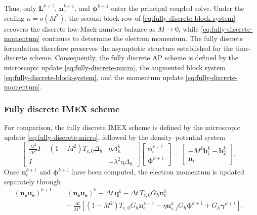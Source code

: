 \documentclass[pdflatex,final,10pt]{article}
\begin{document}
Thus, only $\boldsymbol{L}^{k+1}$, $\boldsymbol{n}_e^{k+1}$, and
$\boldsymbol{\phi}^{k+1}$ enter the principal coupled solve. Under the
scaling $\kappa=o(M^2)$, the second block row of
\eqref{eq:fully-discrete-block-system} recovers the discrete
low-Mach-number balance as $M\to0$, while
\eqref{eq:fully-discrete-momentum} continues to determine the electron
momentum. The fully discrete formulation therefore preserves the
asymptotic structure established for the time-discrete scheme.
Consequently, the fully discrete AP scheme is defined by the microscopic
update \eqref{eq:fully-discrete-micro}, the augmented block system
\eqref{eq:fully-discrete-block-system}, and the momentum update
\eqref{eq:fully-discrete-momentum}.

\subsubsection{Fully discrete IMEX scheme}

For comparison, the fully discrete IMEX scheme is defined by the
microscopic update \eqref{eq:fully-discrete-micro}, followed by the
density--potential system
\begin{equation}
    \begin{bmatrix}
        \displaystyle
        \frac{M^2}{\Delta t^2}I
        -(1-M^2)T_{e,0}\Delta_h
        &
        \eta\mathcal{A}_h^k
        \\[0.4em]
        I
        &
        -\lambda^2\eta\Delta_h
    \end{bmatrix}
    \begin{bmatrix}
        \boldsymbol{n}_e^{k+1}\\
        \boldsymbol{\phi}^{k+1}
    \end{bmatrix}
    =
    \begin{bmatrix}
        -M^2\boldsymbol{b}_1^k-\boldsymbol{b}_2^k\\
        \boldsymbol{n}_i
    \end{bmatrix}.
    \label{eq:fully-discrete-IMEX-density-potential}
\end{equation}
Once $\boldsymbol{n}_e^{k+1}$ and
$\boldsymbol{\phi}^{k+1}$ have been computed, the electron momentum is
updated separately through
\begin{equation}
\begin{aligned}
    \boldsymbol{(n_eu_e)}^{k+1}
    &=
    \boldsymbol{(n_eu_e)}^k
    -\Delta t\,\boldsymbol{q}^k
    -\Delta t\,T_{e,0}G_h\boldsymbol{n}_e^k
    \\
    &\quad
    -\frac{\Delta t}{M^2}
    \left[
        (1-M^2)T_{e,0}G_h\boldsymbol{n}_e^{k+1}
        -\eta\boldsymbol{n}_{e,f}^k
        G_h\boldsymbol{\phi}^{k+1}
        +G_h\boldsymbol{\gamma}^{k+1}
    \right].
\end{aligned}
\label{eq:fully-discrete-IMEX-momentum}
\end{equation}
\end{document}
